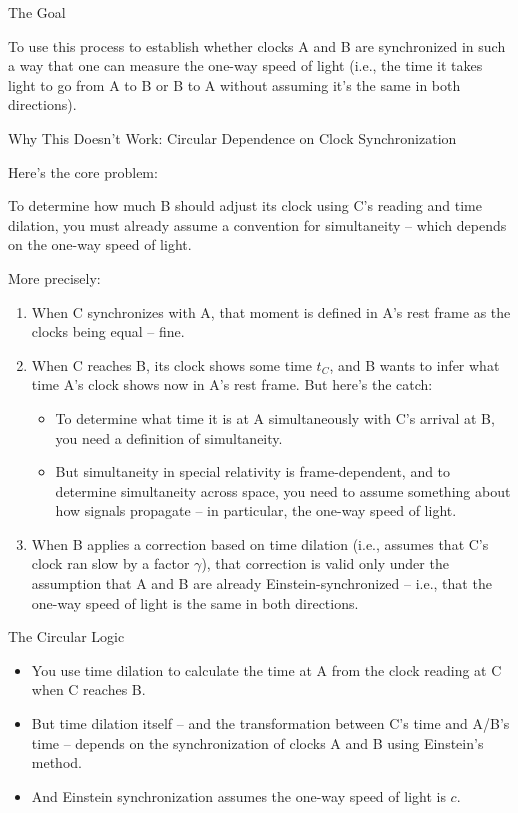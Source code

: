 \documentclass[a4paper]{article}
\theoremstyle{plain}
\theoremstyle{definition}
\begin{document}
The Goal

To use this process to establish whether clocks A and B are
synchronized in such a way that one can measure the one-way speed of
light (i.e., the time it takes light to go from A to B or B to A
without assuming it's the same in both directions).

Why This Doesn't Work: Circular Dependence on Clock Synchronization

Here’s the core problem:

To determine how much B should adjust its clock using C’s reading and
time dilation, you must already assume a convention for simultaneity
-- which depends on the one-way speed of light.

More precisely:

\begin{enumerate}

\item When C synchronizes with A, that moment is defined in A’s rest
  frame as the clocks being equal -- fine.

\item When C reaches B, its clock shows some time $t_C$, and B wants
  to infer what time A’s clock shows now in A’s rest frame. But here’s
  the catch:

  \begin{itemize}
  \item To determine what time it is at A simultaneously with C’s
    arrival at B, you need a definition of simultaneity.
  \item But simultaneity in special relativity is frame-dependent, and
    to determine simultaneity across space, you need to assume
    something about how signals propagate -- in particular, the
    one-way speed of light.
  \end{itemize}

\item When B applies a correction based on time dilation (i.e.,
  assumes that C's clock ran slow by a factor $\gamma$), that
  correction is valid only under the assumption that A and B are
  already Einstein-synchronized -- i.e., that the one-way speed of
  light is the same in both directions.
\end{enumerate}

The Circular Logic

\begin{itemize}
\item You use time dilation to calculate the time at A from the clock
  reading at C when C reaches B.
\item But time dilation itself -- and the transformation between C's
  time and A/B's time -- depends on the synchronization of clocks A
  and B using Einstein's method.
\item And Einstein synchronization assumes the one-way speed of light
  is $c$.
\end{itemize}
\end{document}
